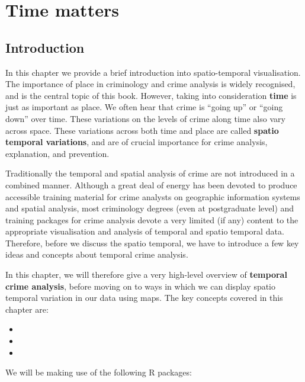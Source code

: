 \documentclass[
]{book}
\providecommand{\tightlist}{%
  \setlength{\itemsep}{0pt}\setlength{\parskip}{0pt}}
\begin{document}
\hypertarget{time-matters}{%
\chapter{Time matters}\label{time-matters}}

\hypertarget{introduction-5}{%
\section{Introduction}\label{introduction-5}}

In this chapter we provide a brief introduction into spatio-temporal visualisation. The importance of place in criminology and crime analysis is widely recognised, and is the central topic of this book. However, taking into consideration \textbf{time} is just as important as place. We often hear that crime is ``going up'' or ``going down'' over time. These variations on the levels of crime along time also vary across space. These variations across both time and place are called \textbf{spatio temporal variations}, and are of crucial importance for crime analysis, explanation, and prevention.

Traditionally the temporal and spatial analysis of crime are not introduced in a combined manner. Although a great deal of energy has been devoted to produce accessible training material for crime analysts on geographic information systems and spatial analysis, most criminology degrees (even at postgraduate level) and training packages for crime analysis devote a very limited (if any) content to the appropriate visualisation and analysis of temporal and spatio temporal data. Therefore, before we discuss the spatio temporal, we have to introduce a few key ideas and concepts about temporal crime analysis.

In this chapter, we will therefore give a very high-level overview of \textbf{temporal crime analysis}, before moving on to ways in which we can display spatio temporal variation in our data using maps. The key concepts covered in this chapter are:

\begin{itemize}
\tightlist
\item
\item
\item
\end{itemize}

We will be making use of the following R packages:
\end{document}
